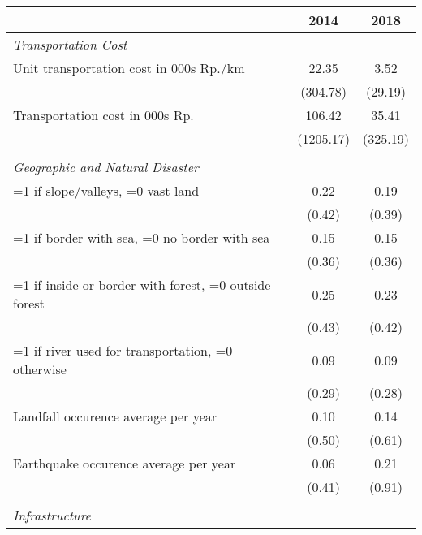 \begin{tabular}{l*{2}{c}}
\hline\hline
                    &        2014&        2018\\
\hline
\emph{Transportation Cost}&            &            \\
\hspace{0.25cm} Unit transportation cost in 000s Rp./km&       22.35&        3.52\\
                    &    (304.78)&     (29.19)\\
\hspace{0.25cm} Transportation cost in 000s Rp.&      106.42&       35.41\\
                    &   (1205.17)&    (325.19)\\
\vspace{0.05em} \\ \emph{Geographic and Natural Disaster}&            &            \\
\hspace{0.25cm} =1 if slope/valleys, =0 vast land&        0.22&        0.19\\
                    &      (0.42)&      (0.39)\\
\hspace{0.25cm} =1 if border with sea, =0 no border with sea&        0.15&        0.15\\
                    &      (0.36)&      (0.36)\\
\hspace{0.25cm} =1 if inside or border with forest, =0 outside forest&        0.25&        0.23\\
                    &      (0.43)&      (0.42)\\
\hspace{0.25cm} =1 if river used for transportation, =0 otherwise&        0.09&        0.09\\
                    &      (0.29)&      (0.28)\\
\hspace{0.25cm} Landfall occurence average per year&        0.10&        0.14\\
                    &      (0.50)&      (0.61)\\
\hspace{0.25cm} Earthquake occurence average per year&        0.06&        0.21\\
                    &      (0.41)&      (0.91)\\
\vspace{0.05em} \\ \emph{Infrastructure}&            &            \\

\end{tabular}
